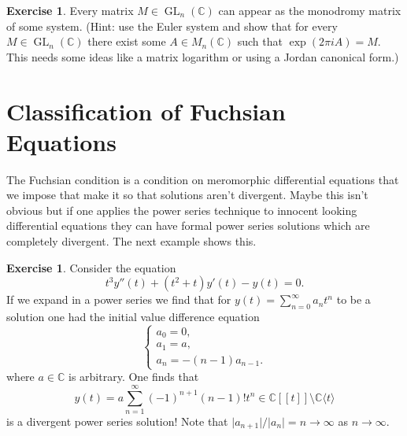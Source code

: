 \documentclass[12pt]{book}
\numberwithin{equation}{section}
\theoremstyle{definition}
\newtheorem{exercise}[theorem]{Exercise}
\theoremstyle{remark}
\newcommand{\CC}{\mathbb{C}}
\newcommand{\GL}{\operatorname{GL}}
\begin{document}
\begin{exercise}
	Every matrix $M \in \GL_n(\CC)$ can appear as the monodromy matrix of some system. (Hint: use the Euler system and show that for every $M \in \GL_n(\CC)$ there exist some $A \in M_n(\CC)$ such that $\exp(2\pi i A) = M$. This needs some ideas like a matrix logarithm or using a Jordan canonical form.)
\end{exercise}

\section[Fuchsian Condition]{Classification of Fuchsian Equations}
The Fuchsian condition is a condition on meromorphic differential equations that we impose that make it so that solutions aren't divergent. 
Maybe this isn't obvious but if one applies the power series technique to innocent looking differential equations they can have formal power series solutions which are completely divergent. 
The next example shows this.
\begin{exercise}
	Consider the equation 
	 $$ t^3 y''(t) + (t^2+t) y'(t) - y(t) =0.$$
	If we expand in a power series we find that for $ y(t) = \sum_{n=0}^{\infty} a_n t^n $
	to be a solution one had the initial value difference equation
	$$\begin{cases}
	a_0 =0, \\
	a_1 = a, \\
	a_n = -(n-1)a_{n-1}.
	\end{cases}$$
	where $a \in \CC$ is arbitrary. 
	One finds that 
	$$ y(t) = a \sum_{n=1}^{\infty} (-1)^{n+1} (n-1)! t^n \in \CC[[t]]\setminus \CC\langle t \rangle$$
	is a divergent power series solution! Note that $\vert a_{n+1} \vert/\vert a_n \vert = n \to \infty$ as $n\to \infty$.
\end{exercise}	
\end{document}
